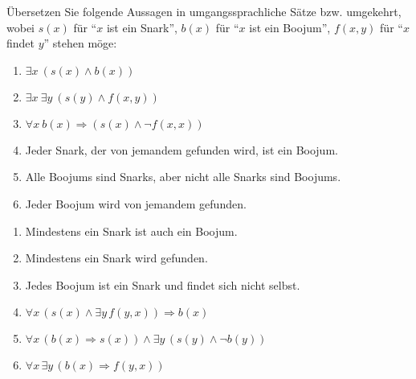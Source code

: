\documentclass[12pt]{exam}
\begin{document}
\begin{questions}
Übersetzen Sie folgende Aussagen in umgangssprachliche Sätze bzw. umgekehrt, wobei $s(x)$ für ``$x$ ist ein Snark'', $b(x)$ für ``$x$ ist ein Boojum'', $f(x,y)$ für ``$x$ findet $y$'' stehen möge:
\begin{enumerate}
	\item $\exists x~(s(x)\wedge b(x))$
	\item $\exists x~\exists y~(s(y)\wedge f(x,y))$
	\item $\forall x~b(x)\Rightarrow (s(x)\wedge \neg f(x,x))$
	\item Jeder Snark, der von jemandem gefunden wird, ist ein Boojum.
	\item Alle Boojums sind Snarks, aber nicht alle Snarks sind Boojums.
	\item Jeder Boojum wird von jemandem gefunden.
\end{enumerate}
\begin{solution}
	\begin{enumerate}
		\item Mindestens ein Snark ist auch ein Boojum.
		\item Mindestens ein Snark wird gefunden.
		\item Jedes Boojum ist ein Snark und findet sich nicht selbst.
		\item $\forall x\, (s(x) \land \exists y\,f(y, x)) \Rightarrow b(x)$
		\item $\forall x\, \left(b(x) \Rightarrow s(x)\right) \land \exists y\, \left(s(y) \land \neg b(y)\right)$
		\item $\forall x\, \exists y\, \left(b(x) \Rightarrow f(y,x)\right)$
	\end{enumerate}
\end{solution}





\end{questions}
\end{document}

